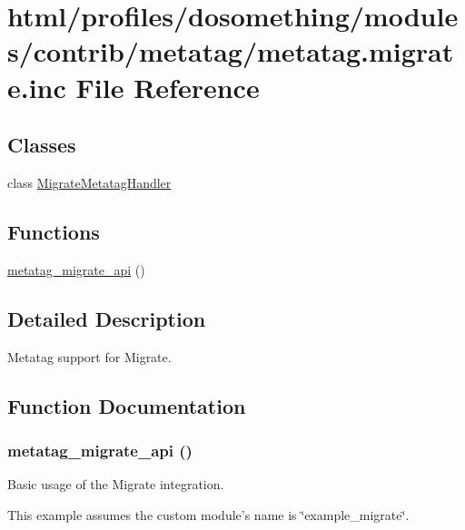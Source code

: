 \hypertarget{metatag_8migrate_8inc}{
\section{html/profiles/dosomething/modules/contrib/metatag/metatag.migrate.inc File Reference}
\label{metatag_8migrate_8inc}
}
\subsection*{Classes}
\begin{DoxyCompactItemize}
\item 
class \hyperlink{classMigrateMetatagHandler}{MigrateMetatagHandler}
\end{DoxyCompactItemize}
\subsection*{Functions}
\begin{DoxyCompactItemize}
\item 
\hyperlink{metatag_8migrate_8inc_aabdbb91f28353ae79e78fb1058288ef6}{metatag\_\-migrate\_\-api} ()
\end{DoxyCompactItemize}


\subsection{Detailed Description}
Metatag support for Migrate. 

\subsection{Function Documentation}
\hypertarget{metatag_8migrate_8inc_aabdbb91f28353ae79e78fb1058288ef6}{
\subsubsection[{metatag\_\-migrate\_\-api}]{\setlength{\rightskip}{0pt plus 5cm}metatag\_\-migrate\_\-api ()}}
\label{metatag_8migrate_8inc_aabdbb91f28353ae79e78fb1058288ef6}
Basic usage of the Migrate integration.

This example assumes the custom module's name is \char`\"{}example\_\-migrate\char`\"{}.

